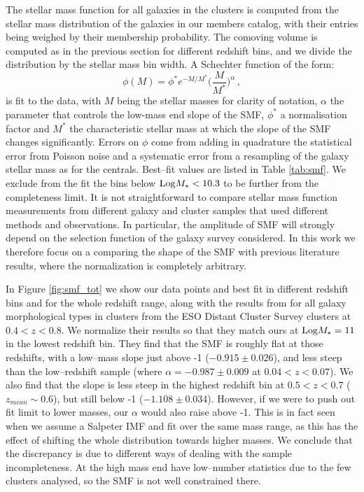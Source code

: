 {The stellar mass function for all galaxies in the clusters is computed from the stellar mass distribution of the galaxies in our members catalog, with their entries being weighed by their membership probability. The comoving volume is computed as in the previous section for different redshift bins, and we divide the distribution by the stellar mass bin width. A Schechter function of the form: 
\begin{equation}
\phi(M) =  \phi^* e^{-M/M^*}\Big(\frac{M}{M^*} \Big)^\alpha\,,\label{eq:smf_tot}
\end{equation}
is fit to the data, with $M$ being the stellar masses for clarity of notation, $\alpha$ the parameter that controls the low-mass end slope of the SMF, $\phi^*$ a normalisation factor and $M^*$ the characteristic stellar mass at which the slope of the SMF changes significantly. Errors on $\phi$ come from adding in quadrature the statistical error from Poisson noise and a systematic error from a resampling of the galaxy stellar mass as for the centrals. Best--fit values are listed in Table \ref{tab:smf}. We exclude from the fit the bins below ${\rm Log} M_\star<10.3$ to be further from the completeness limit.
It is not straightforward to compare stellar mass function measurements from different galaxy and cluster samples that used different methods and observations. In particular, the amplitude of SMF will strongly depend on the selection function of the galaxy survey considered. In this work we therefore focus on a comparing the shape of the SMF with previous literature results, where the normalization is completely arbitrary.

In Figure \ref{fig:smf_tot} we show our data points and best fit in different redshift bins and for the whole redshift range, along with the results from \citet{vulcani} for all galaxy morphological types in clusters from the ESO Distant Cluster Survey clusters at $0.4<z<0.8$. We normalize their results so that they match ours at ${\rm Log} M_\star =11$ in the lowest redshift bin. They find that the SMF is roughly flat at those redshifts, with a low--mass slope just above -1 ($-0.915\pm 0.026$), and less steep than the low--redshift sample (where $\alpha=-0.987\pm0.009$ at $0.04<z<0.07$). We also find that the slope is less steep in the highest redshift bin at $0.5<z<0.7$ ($z_{mean}\sim 0.6$), but still below -1 ($-1.108 \pm 0.034$). However, if we were to push out fit limit to lower masses, our $\alpha$ would also raise above -1. This is in fact seen when we assume a Salpeter IMF and fit over the same mass range, as this has the effect of shifting the whole distribution towards higher masses. We conclude that the discrepancy is due to different ways of dealing with the sample incompleteness. At the high mass end \citet{vulcani} have low--number statistics due to the few clusters analysed, so the SMF is not well constrained there.

}
